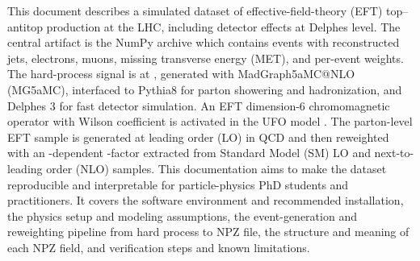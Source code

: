 \markdownRendererDocumentBegin
\markdownRendererSectionBegin
{}\markdownRendererInterblockSeparator
{}\markdownRendererSectionBegin
{}\markdownRendererInterblockSeparator
{}This document describes a simulated dataset of effective-field-theory (EFT) top–antitop production at the LHC, including detector effects at Delphes level. The central artifact is the NumPy archive\markdownRendererInterblockSeparator
{}\markdownRendererUlBeginTight
\markdownRendererUlItem {}\markdownRendererUlItemEnd 
\markdownRendererUlEndTight \markdownRendererInterblockSeparator
{}which contains  events with reconstructed jets, electrons, muons, missing transverse energy (MET), and per-event weights.\markdownRendererParagraphSeparator
{}The hard-process signal is  at , generated with MadGraph5\markdownRendererUnderscore{}aMC@NLO (MG5\markdownRendererUnderscore{}aMC), interfaced to Pythia8 for parton showering and hadronization, and Delphes 3 for fast detector simulation. An EFT dimension-6 chromomagnetic operator with Wilson coefficient  is activated in the UFO model . The parton-level EFT sample is generated at leading order (LO) in QCD and then reweighted with an -dependent -factor extracted from Standard Model (SM) LO and next-to-leading order (NLO)  samples.\markdownRendererParagraphSeparator
{}This documentation aims to make the dataset reproducible and interpretable for particle-physics PhD students and practitioners. It covers\markdownRendererInterblockSeparator
{}\markdownRendererUlBeginTight
\markdownRendererUlItem the software environment and recommended installation,\markdownRendererUlItemEnd 
\markdownRendererUlItem the physics setup and modeling assumptions,\markdownRendererUlItemEnd 
\markdownRendererUlItem the event-generation and reweighting pipeline from hard process to NPZ file,\markdownRendererUlItemEnd 
\markdownRendererUlItem the structure and meaning of each NPZ field, and\markdownRendererUlItemEnd 
\markdownRendererUlItem verification steps and known limitations.\markdownRendererUlItemEnd 
